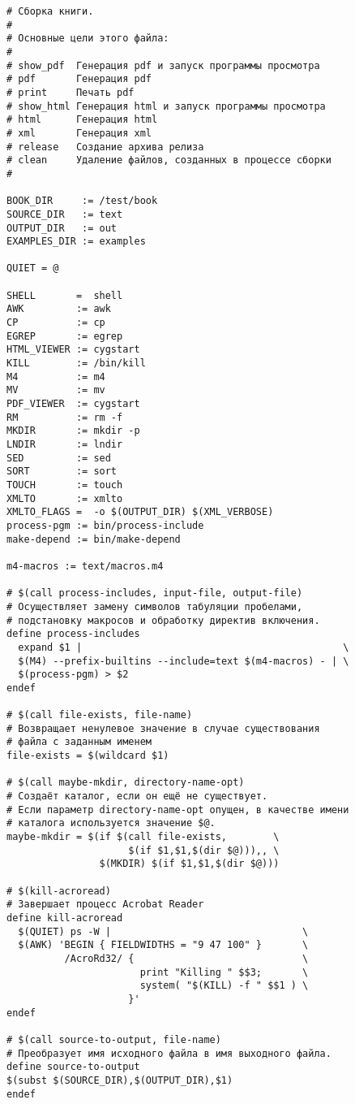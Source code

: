 \begin{verbatim}
# Сборка книги.
#
# Основные цели этого файла:
#
# show_pdf  Генерация pdf и запуск программы просмотра
# pdf       Генерация pdf
# print     Печать pdf
# show_html Генерация html и запуск программы просмотра
# html      Генерация html
# xml       Генерация xml
# release   Создание архива релиза
# clean     Удаление файлов, созданных в процессе сборки
#

BOOK_DIR     := /test/book
SOURCE_DIR   := text
OUTPUT_DIR   := out
EXAMPLES_DIR := examples

QUIET = @

SHELL       =  shell
AWK         := awk
CP          := cp
EGREP       := egrep
HTML_VIEWER := cygstart
KILL        := /bin/kill
M4          := m4
MV          := mv
PDF_VIEWER  := cygstart
RM          := rm -f
MKDIR       := mkdir -p
LNDIR       := lndir
SED         := sed
SORT        := sort
TOUCH       := touch
XMLTO       := xmlto
XMLTO_FLAGS =  -o $(OUTPUT_DIR) $(XML_VERBOSE)
process-pgm := bin/process-include
make-depend := bin/make-depend

m4-macros := text/macros.m4

# $(call process-includes, input-file, output-file)
# Осуществляет замену символов табуляции пробелами,
# подстановку макросов и обработку директив включения.
define process-includes
  expand $1 |                                             \
  $(M4) --prefix-builtins --include=text $(m4-macros) - | \
  $(process-pgm) > $2
endef

# $(call file-exists, file-name)
# Возвращает ненулевое значение в случае существования
# файла с заданным именем
file-exists = $(wildcard $1)

# $(call maybe-mkdir, directory-name-opt)
# Создаёт каталог, если он ещё не существует.
# Если параметр directory-name-opt опущен, в качестве имени
# каталога используется значение $@.
maybe-mkdir = $(if $(call file-exists,        \
                     $(if $1,$1,$(dir $@))),, \
                $(MKDIR) $(if $1,$1,$(dir $@)))

# $(kill-acroread)
# Завершает процесс Acrobat Reader
define kill-acroread
  $(QUIET) ps -W |                                 \
  $(AWK) 'BEGIN { FIELDWIDTHS = "9 47 100" }       \
          /AcroRd32/ {                             \
                       print "Killing " $$3;       \
                       system( "$(KILL) -f " $$1 ) \
                     }'
endef

# $(call source-to-output, file-name)
# Преобразует имя исходного файла в имя выходного файла.
define source-to-output
$(subst $(SOURCE_DIR),$(OUTPUT_DIR),$1)
endef


\end{verbatim}
